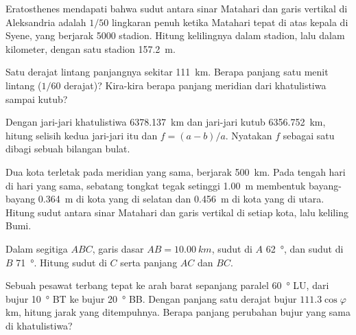 \begin{exercise}[$\star$]\label{exo:g10:measuring-the-earth:3}
Eratosthenes mendapati bahwa sudut antara sinar Matahari dan garis vertikal
di Aleksandria adalah $1/50$ lingkaran penuh ketika Matahari tepat di atas
kepala di Syene, yang berjarak 5000 stadion. Hitung kelilingnya dalam stadion,
lalu dalam kilometer, dengan satu stadion \qty{157.2}{m}.
\end{exercise}

\begin{exercise}[$\star$]\label{exo:g10:measuring-the-earth:4}
Satu derajat lintang panjangnya sekitar \qty{111}{km}. Berapa panjang satu
menit lintang ($1/60$ derajat)? Kira-kira berapa panjang meridian dari
khatulistiwa sampai kutub?
\end{exercise}

\begin{exercise}[$\star$]\label{exo:g10:measuring-the-earth:5}
Dengan jari-jari khatulistiwa \qty{6378.137}{km} dan jari-jari kutub
\qty{6356.752}{km}, hitung selisih kedua jari-jari itu dan 
$f = (a-b)/a$. Nyatakan $f$ sebagai satu dibagi sebuah bilangan bulat.
\end{exercise}

\begin{exercise}[$\star\star$]\label{exo:g10:measuring-the-earth:6}
Dua kota terletak pada meridian yang sama, berjarak \qty{500}{km}. Pada tengah
hari di hari yang sama, sebatang tongkat tegak setinggi \qty{1.00}{m}
membentuk bayang-bayang \qty{0.364}{m} di kota yang di selatan dan
\qty{0.456}{m} di kota yang di utara. Hitung sudut antara sinar Matahari dan
garis vertikal di setiap kota, lalu keliling Bumi.
\end{exercise}

\begin{exercise}[$\star\star$]\label{exo:g10:measuring-the-earth:7}
Dalam segitiga $ABC$, garis dasar $AB = \qty{10.00}{km}$, sudut di $A$
\qty{62}{\degree}, dan sudut di $B$ \qty{71}{\degree}. Hitung sudut di $C$
serta panjang $AC$ dan $BC$.
\end{exercise}

\begin{exercise}[$\star\star$]\label{exo:g10:measuring-the-earth:8}
Sebuah pesawat terbang tepat ke arah barat sepanjang paralel
\qty{60}{\degree} LU, dari bujur \qty{10}{\degree} BT ke bujur
\qty{20}{\degree} BB. Dengan panjang satu derajat bujur $111.3 \cos \varphi$
km, hitung jarak yang ditempuhnya. Berapa panjang perubahan bujur yang sama
di khatulistiwa?
\end{exercise}

